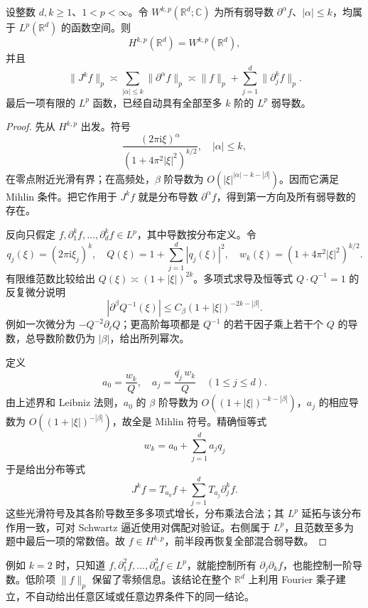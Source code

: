 \begin{proposition}\label{b2:prop:22-integer-sobolev}
设整数 \(d,k\geq1\)、\(1<p<\infty\)。令 \(W^{k,p}(\mathbb R^d;\mathbb C)\) 为所有弱导数 \(\partial^\alpha f\)、\(|\alpha|\leq k\)，均属于 \(L^p(\mathbb R^d)\) 的函数空间。则
\[
 H^{k,p}(\mathbb R^d)=W^{k,p}(\mathbb R^d),
\]
并且
\[
 \|J^kf\|_p
 \asymp\sum_{|\alpha|\leq k}\|\partial^\alpha f\|_p
 \asymp\|f\|_p+\sum_{j=1}^d\|\partial_j^kf\|_p.
\]
最后一项有限的 \(L^p\) 函数，已经自动具有全部至多 \(k\) 阶的 \(L^p\) 弱导数。
\end{proposition}
\begin{proof}
先从 \(H^{k,p}\) 出发。符号
\[
 \frac{(2\pi\mathrm i\xi)^\alpha}
      {(1+4\pi^2|\xi|^2)^{k/2}},
 \quad |\alpha|\leq k,
\]
在零点附近光滑有界；在高频处，\(\beta\) 阶导数为
\(O(|\xi|^{|\alpha|-k-|\beta|})\)。因而它满足 Mihlin 条件。把它作用于 \(J^kf\) 就是分布导数 \(\partial^\alpha f\)，得到第一方向及所有弱导数的存在。

反向只假定 \(f,\partial_1^kf,\ldots,\partial_d^kf\in L^p\)，其中导数按分布定义。令
\[
 q_j(\xi)=(2\pi\mathrm i\xi_j)^k,\quad
 Q(\xi)=1+\sum_{j=1}^d|q_j(\xi)|^2,\quad
 w_k(\xi)=(1+4\pi^2|\xi|^2)^{k/2}.
\]
有限维范数比较给出 \(Q(\xi)\asymp(1+|\xi|)^{2k}\)。多项式求导及恒等式 \(Q\cdot Q^{-1}=1\) 的反复微分说明
\[
 |\partial^\beta Q^{-1}(\xi)|
 \leq C_\beta(1+|\xi|)^{-2k-|\beta|}.
\]
例如一次微分为 \(-Q^{-2}\partial_\ell Q\)；更高阶每项都是 \(Q^{-1}\) 的若干因子乘上若干个 \(Q\) 的导数，总导数阶数仍为 \(|\beta|\)，给出所列幂次。

定义
\[
 a_0=\frac{w_k}{Q},\quad
 a_j=\frac{\overline{q_j}\,w_k}{Q}\quad(1\leq j\leq d).
\]
由上述界和 Leibniz 法则，\(a_0\) 的 \(\beta\) 阶导数为
\(O((1+|\xi|)^{-k-|\beta|})\)，\(a_j\) 的相应导数为
\(O((1+|\xi|)^{-|\beta|})\)，故全是 Mihlin 符号。精确恒等式
\[
 w_k=a_0+\sum_{j=1}^d a_jq_j
\]
于是给出分布等式
\[
 J^kf=T_{a_0}f+\sum_{j=1}^dT_{a_j}\partial_j^kf.
\]
这些光滑符号及其各阶导数至多多项式增长，分布乘法合法；其 \(L^p\) 延拓与该分布作用一致，可对 Schwartz 逼近使用对偶配对验证。右侧属于 \(L^p\)，且范数至多为题中最后一项的常数倍。故 \(f\in H^{k,p}\)，前半段再恢复全部混合弱导数。
\end{proof}
例如 \(k=2\) 时，只知道 \(f,\partial_1^2f,\ldots,\partial_d^2f\in L^p\)，就能控制所有 \(\partial_j\partial_kf\)，也能控制一阶导数。低阶项 \(\|f\|_p\) 保留了零频信息。该结论在整个 \(\mathbb R^d\) 上利用 Fourier 乘子建立，不自动给出任意区域或任意边界条件下的同一结论。

\ProseParagraphBreak

